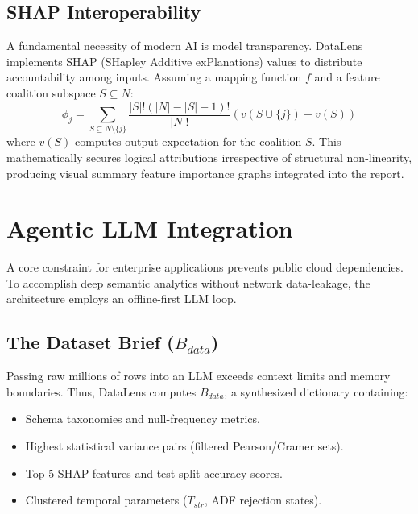 \documentclass[conference]{IEEEtran}
\begin{document}
\subsection{SHAP Interoperability}
A fundamental necessity of modern AI is model transparency. DataLens implements SHAP (SHapley Additive exPlanations) values to distribute accountability among inputs. Assuming a mapping function $f$ and a feature coalition subspace $S \subseteq N$:
\begin{equation}
    \phi_j = \sum_{S \subseteq N \setminus \{j\}} \frac{|S|!(|N|-|S|-1)!}{|N|!} \left( v(S \cup \{j\}) - v(S) \right)
\end{equation}
where $v(S)$ computes output expectation for the coalition $S$. This mathematically secures logical attributions irrespective of structural non-linearity, producing visual summary feature importance graphs integrated into the report.

\section{Agentic LLM Integration}\label{sec:agent}
A core constraint for enterprise applications prevents public cloud dependencies. To accomplish deep semantic analytics without network data-leakage, the architecture employs an offline-first LLM loop.

\subsection{The Dataset Brief ($B_{data}$)}
Passing raw millions of rows into an LLM exceeds context limits and memory boundaries. Thus, DataLens computes $B_{data}$, a synthesized dictionary containing:
\begin{itemize}
    \item Schema taxonomies and null-frequency metrics.
    \item Highest statistical variance pairs (filtered Pearson/Cramer sets).
    \item Top 5 SHAP features and test-split accuracy scores.
    \item Clustered temporal parameters ($T_{str}$, ADF rejection states).
\end{itemize}
\end{document}
